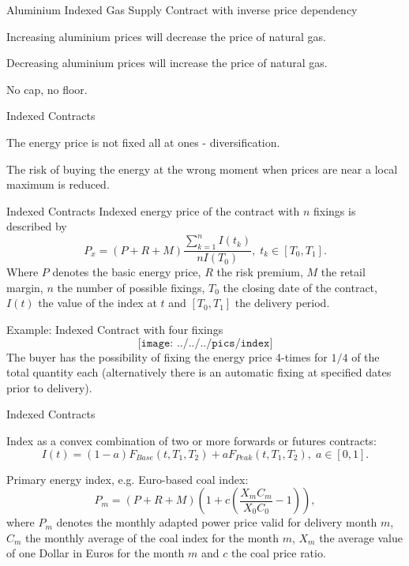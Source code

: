 {Aluminium Indexed Gas Supply Contract with inverse price dependency}






	Increasing aluminium prices will decrease the price of natural gas.

	Decreasing aluminium prices will increase the price of natural gas.

	No cap, no floor.






{Indexed Contracts}






	The energy price is not fixed all at ones - diversification.

	The risk of buying the energy at the wrong moment when prices are near a local maximum is reduced.






{Indexed Contracts}
Indexed energy price of the contract with $n$ fixings is described by
$$P_x=(P+R+M)\frac{\sum_{k=1}^n{I(t_k)}}{nI(T_0)},\;t_k\in[T_0,T_1].$$
Where $P$ denotes the basic energy price, $R$ the risk premium, $M$ the retail margin, $n$ the number of possible fixings,
$T_0$ the closing date of the contract, $I(t)$ the value of the index at $t$ and $[T_0,T_1]$ the delivery period.

{Example: Indexed Contract with four fixings}
$$\texttt{[image: ../../../pics/index]}$$
The buyer has the possibility of fixing the energy price 4-times for $1/4$ of the total quantity each (alternatively there is an automatic fixing at specified dates prior to delivery).

{Indexed Contracts}






	Index as a convex combination of two or more forwards or futures contracts:
  $$I(t)=(1-a)F_{Base}(t,T_1,T_2)+aF_{Peak}(t,T_1,T_2),\;a\in[0,1].$$

	Primary energy index, e.g. Euro-based coal index:
  $$P_m=(P+R+M)\left(1+c\left(\frac{X_mC_m}{X_0C_0}-1\right)\right),$$
  where $P_m$ denotes the monthly adapted power price valid for delivery month $m$, $C_m$ the monthly average of the coal index for the month $m$, $X_m$ the average value of one Dollar in Euros for the month $m$ and $c$ the coal price ratio.



